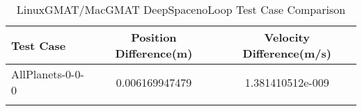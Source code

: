 \begin{table}[htbp!]
\centering
\caption{ LinuxGMAT/MacGMAT DeepSpacenoLoop Test Case Comparison}
      \begin{tabular}{lcc}
      \hline\hline
          Test Case & Position Difference(m) & Velocity Difference(m/s) \\
         \hline
         AllPlanets-0-0-0 & 0.006169947479 & 1.381410512e-009 \\
      \hline\hline
      \label{Table: DeepSpacenoLoop LinuxGMAT-MacGMAT Table} 
\end{tabular}
\end{table}
